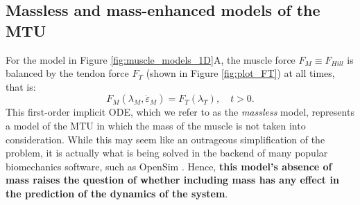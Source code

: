 \documentclass{sfuthesis}
\numberwithin{equation}{section}
\numberwithin{figure}{chapter}
\numberwithin{table}{chapter}
\theoremstyle{definition}
\newcommand{\depsilon}{\dot{\varepsilon}}
\begin{document}
    


\subsection{Massless and mass-enhanced models of the MTU}

For the model in Figure \ref{fig:muscle_models_1D}A, the muscle force $F_M \equiv F_{Hill}$ is balanced by the tendon force $F_T$ (shown in Figure \ref{fig:plot_FT}) at all times, that is:
\begin{equation} \label{eq:massless_model}
    F_M(\lambda_M, \depsilon_M) = F_T(\lambda_T), \quad t > 0.
\end{equation}
This first-order implicit ODE, which we refer to as the \textit{massless} model, represents a model of the MTU in which the mass of the muscle is not taken into consideration. While this may seem like an outrageous simplification of the problem, it is actually what is being solved in the backend of many popular biomechanics software, such as OpenSim \cite{Delp2007OpenSim}. Hence, \textbf{this model's absence of mass raises the question of whether including mass has any effect in the prediction of the dynamics of the system}. 
\end{document}
